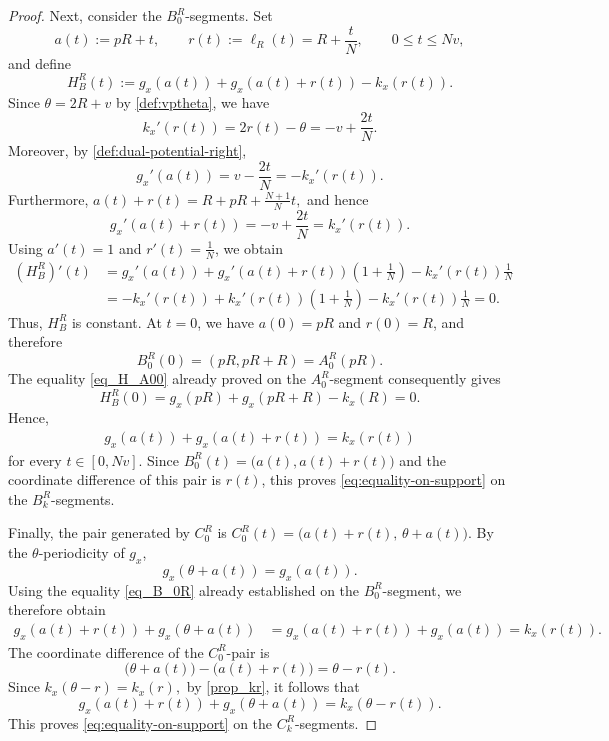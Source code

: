 \documentclass{article}
\begin{document}
\begin{proof}
Next, consider the \(B_0^R\)-segments.
Set
\[
    a(t):=pR+t,
    \qquad
    r(t):=\ell_R(t)=R+\frac{t}{N},
    \qquad
    0\leq t\leq Nv,
\]
and define
\[
    H_B^R(t)
    :=
    g_x(a(t))
    +
    g_x(a(t)+r(t))
    -
    k_x(r(t)).
\]
Since \(\theta=2R+v\) by \eqref{def:vptheta}, we have
\[
    k_x'(r(t))
    =
    2r(t)-\theta
    =
    -v+\frac{2t}{N}.
\]
Moreover, by \eqref{def:dual-potential-right},
\[
    g_x'(a(t))
    =
    v-\frac{2t}{N}
    =
    -k_x'(r(t)).
\]
Furthermore, \(a(t)+r(t) = R+pR+\frac{N+1}{N}t, \) and hence
\[
    g_x'(a(t)+r(t))
    =
    -v+\frac{2t}{N}
    =
    k_x'(r(t)).
\]
Using \(a'(t)=1\) and \(r'(t)=\frac1N\), we obtain
\begin{align*}
    (H_B^R)'(t)
    &=
    g_x'(a(t))
    +
    g_x'(a(t)+r(t))
    \left(1+\frac1N\right)
    -
    k_x'(r(t))\frac1N
    \\
    &=
    -k_x'(r(t))
    +
    k_x'(r(t))
    \left(1+\frac1N\right)
    -
    k_x'(r(t))\frac1N
    =0.
\end{align*}
Thus, \(H_B^R\) is constant.
At \(t=0\), we have \(a(0)=pR\) and \(r(0)=R\), and therefore
\[
    B_0^R(0)
    =
    (pR,pR+R)
    =
    A_0^R(pR).
\]
The equality \eqref{eq_H_A00} already proved on the \(A_0^R\)-segment consequently gives
\[
    H_B^R(0)
    =
    g_x(pR)+g_x(pR+R)-k_x(R)
    =
    0.
\]
Hence,
\begin{align}\label{eq_B_0R}
    g_x(a(t))+g_x(a(t)+r(t))
    =
    k_x(r(t))
\end{align}
for every \(t\in[0,Nv]\).
Since
\(
    B_0^R(t)
    =
    \bigl(a(t),a(t)+r(t)\bigr)
\)
and the coordinate difference of this pair is \(r(t)\), this proves \eqref{eq:equality-on-support} on the \(B_k^R\)-segments.

Finally, the pair generated by \(C_0^R\) is
\(
    C_0^R(t)
    =
    \bigl(a(t)+r(t),\,\theta+a(t)\bigr).
\)
By the \(\theta\)-periodicity of \(g_x\),
\[
    g_x(\theta+a(t))=g_x(a(t)).
\]
Using the equality \eqref{eq_B_0R} already established on the \(B_0^R\)-segment, we therefore obtain
\begin{align*}
    g_x(a(t)+r(t))+g_x(\theta+a(t))
    &=
    g_x(a(t)+r(t))+g_x(a(t))
    =
    k_x(r(t)).
\end{align*}
The coordinate difference of the \(C_0^R\)-pair is
\[
    \bigl(\theta+a(t)\bigr)
    -
    \bigl(a(t)+r(t)\bigr)
    =
    \theta-r(t).
\]
Since
\(
    k_x(\theta-r)=k_x(r),
\) by \eqref{prop_kr},
it follows that
\[
    g_x(a(t)+r(t))+g_x(\theta+a(t))
    =
    k_x(\theta-r(t)).
\]
This proves \eqref{eq:equality-on-support} on the
\(C_k^R\)-segments.


\end{proof}
\end{document}
